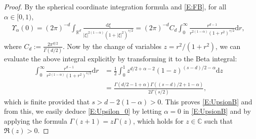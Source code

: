 \documentclass[12pt]{report}
\theoremstyle{plain}
\theoremstyle{definition}
\numberwithin{equation}{section}
\newcommand{\R}{\mathbb{R}}
\newcommand{\ud}{\ensuremath{ \mathrm{d} }}
\begin{document}
\begin{proof}
	By the spherical coordinate integration formula and \eqref{E:FB}, for all $\alpha\in[0,1)$,
	\begin{align*}
	\Upsilon_\alpha(0) = \left(2\pi\right)^{-d} \int_{\R^d} \frac{\ud\xi}{|\xi|^{2(1-\alpha)}\left(1+|\xi|^2\right)^{s/2}}
	= \left(2\pi\right)^{-d} C_d \int_0^\infty \frac{r^{d-1}}{r^{2(1-\alpha)}\left(1+r^2\right)^{s/2}} \ud r,
	\end{align*}
	where $C_d:=\frac{2\pi^{d/2}}{\Gamma\left(d/2\right)}$. Now by the change of variables $z=r^2/(1+r^2)$,
	we can evaluate the above integral explicitly by transforming it to the Beta integral:
	\begin{align*}
	\int_0^\infty \frac{r^{d-1}}{r^{2(1-\alpha)}\left(1+r^2\right)^{s/2}} \ud r
	& = \frac{1}{2} \int_0^1 z^{d/2+\alpha-2}(1-z)^{(s-d)/2-\alpha}\ud z \\
	& = \frac{\Gamma\left(d/2-1+\alpha\right)\Gamma\left((s-d)/2+1-\alpha\right)}{2\Gamma(s/2)},
	\end{align*}
	which is finite provided that $s>d-2(1-\alpha)>0$. This proves \eqref{E:UpsionB} and from this, we easily deduce \eqref{E:Upsilon_0} by letting $\alpha = 0$ in \eqref{E:UpsionB} and by applying the formula $\Gamma(z+1) = z\Gamma(z)$, which holds for $z\in \mathbb{C}$ such that $\Re(z)>0$. 
	

\end{proof}
\end{document}
